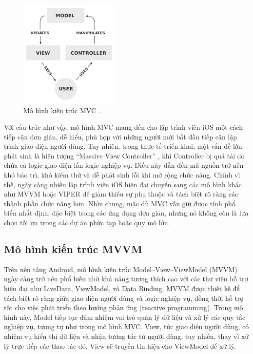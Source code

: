 \begin{figure}[H]
    \centering
    \includegraphics[width=0.44\textwidth]{images/mvc.png}
    \caption{Mô hình kiến trúc MVC \cite{daynhauhocMVC}.}
    \label{fig:fig12}
  \end{figure}

    
      \hspace*{0.8cm}Với cấu trúc như vậy, mô hình MVC mang đến cho lập trình viên iOS một cách tiếp cận đơn giản, dễ hiểu, phù hợp với những người mới bắt đầu tiếp cận lập trình giao diện người dùng. Tuy nhiên, trong thực tế triển khai, một vấn đề lớn phát sinh là hiện tượng “Massive View Controller” \cite{massive_vc}, khi Controller bị quá tải do chứa cả logic giao diện lẫn logic nghiệp vụ. Điều này dẫn đến mã nguồn trở nên khó bảo trì, khó kiểm thử và dễ phát sinh lỗi khi mở rộng chức năng. Chính vì thế, ngày càng nhiều lập trình viên iOS hiện đại chuyển sang các mô hình khác như MVVM hoặc VIPER để giảm thiểu sự phụ thuộc và tách biệt rõ ràng các thành phần chức năng hơn. Nhìn chung, mặc dù MVC vẫn giữ được tính phổ biến nhất định, đặc biệt trong các ứng dụng đơn giản, nhưng nó không còn là lựa chọn tối ưu trong các dự án phức tạp hoặc quy mô lớn.
    

\subsection{Mô hình kiến trúc MVVM}
\renewcommand{\labelitemi}{--}    
    
        \hspace*{0.8cm}Trên nền tảng Android, mô hình kiến trúc Model–View–ViewModel (MVVM) ngày càng trở nên phổ biến nhờ khả năng tương thích cao với các thư viện hỗ trợ hiện đại như LiveData, ViewModel, và Data Binding. MVVM được thiết kế để tách biệt rõ ràng giữa giao diện người dùng và logic nghiệp vụ, đồng thời hỗ trợ tốt cho việc phát triển theo hướng phản ứng (reactive programming). Trong mô hình này, Model tiếp tục đảm nhiệm vai trò quản lý dữ liệu và xử lý các quy tắc nghiệp vụ, tương tự như trong mô hình MVC. View, tức giao diện người dùng, có nhiệm vụ hiển thị dữ liệu và nhận tương tác từ người dùng, tuy nhiên, thay vì xử lý trực tiếp các thao tác đó, View sẽ truyền tín hiệu cho ViewModel để xử lý.
    

